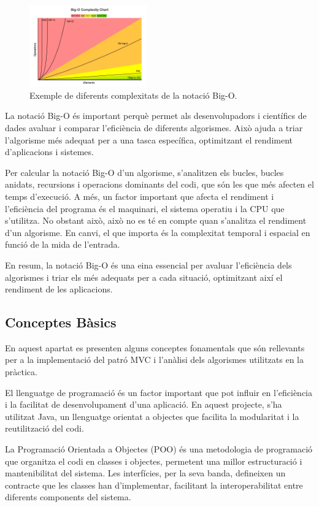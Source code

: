 \documentclass{ieeetj}
\begin{document}
\begin{figure}[htbp]
\centerline{\includegraphics[width=0.45\textwidth]{png/bigO.png}}
\caption{Exemple de diferents complexitats de la notació Big-O.}
\label{fig:big_o}
\end{figure}

La notació Big-O és important perquè permet als desenvolupadors i científics de dades avaluar i comparar l'eficiència de diferents algorismes. Això ajuda a triar l'algorisme més adequat per a una tasca específica, optimitzant el rendiment d'aplicacions i sistemes.

Per calcular la notació Big-O d'un algorisme, s'analitzen els bucles, bucles anidats, recursions i operacions dominants del codi, que són les que més afecten el temps d'execució. A més, un factor important que afecta el rendiment i l'eficiència del programa és el maquinari, el sistema operatiu i la CPU que s'utilitza. No obstant això, això no es té en compte quan s'analitza el rendiment d'un algorisme. En canvi, el que importa és la complexitat temporal i espacial en funció de la mida de l'entrada.

En resum, la notació Big-O és una eina essencial per avaluar l'eficiència dels algorismes i triar els més adequats per a cada situació, optimitzant així el rendiment de les aplicacions.

\subsection{Conceptes Bàsics}
En aquest apartat es presenten alguns conceptes fonamentals que són rellevants per a la implementació del patró MVC i l'anàlisi dels algorismes utilitzats en la pràctica.

El llenguatge de programació és un factor important que pot influir en l'eficiència i la facilitat de desenvolupament d'una aplicació. En aquest projecte, s'ha utilitzat Java, un llenguatge orientat a objectes que facilita la modularitat i la reutilització del codi.

La Programació Orientada a Objectes (POO) és una metodologia de programació que organitza el codi en classes i objectes, permetent una millor estructuració i mantenibilitat del sistema. Les interfícies, per la seva banda, defineixen un contracte que les classes han d'implementar, facilitant la interoperabilitat entre diferents components del sistema.
\end{document}
